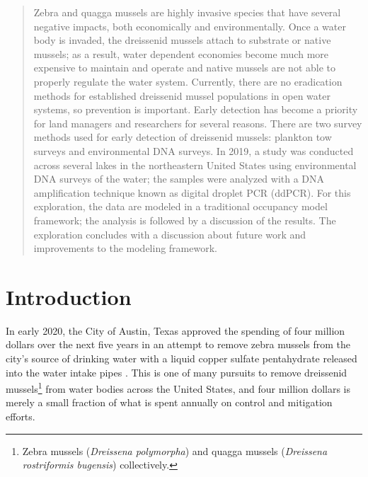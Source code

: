 \documentclass[12pt]{article}\usepackage[]{graphicx}\usepackage[]{color}
\begin{document}
\begin{abstract}
\noindent Zebra and quagga mussels are highly invasive species that have several negative impacts, both economically and environmentally. Once a water body is invaded, the dreissenid mussels attach to substrate or native mussels; as a result, water dependent economies become much more expensive to maintain and operate and native mussels are not able to properly regulate the water system. Currently, there are no eradication methods for established dreissenid mussel populations in open water systems, so prevention is important. Early detection has become a priority for land managers and researchers for several reasons. There are two survey methods used for early detection of dreissenid mussels: plankton tow surveys and environmental DNA surveys. In 2019, a study was conducted across several lakes in the northeastern United States using environmental DNA surveys of the water; the samples were analyzed with a DNA amplification technique known as digital droplet PCR (ddPCR). For this exploration, the data are modeled in a traditional occupancy model framework; the analysis is followed by a discussion of the results. The exploration concludes with a discussion about future work and improvements to the modeling framework. 
\end{abstract}

\newpage

\doublespacing

\section{Introduction}

In early 2020, the City of Austin, Texas approved the spending of four million dollars over the next five years in an attempt to remove zebra mussels from the city's source of drinking water with a liquid copper sulfate pentahydrate released into the water intake pipes \cite{CBS:Austin}. This is one of many pursuits to remove dreissenid mussels\footnote{Zebra mussels (\textit{Dreissena polymorpha}) and quagga mussels (\textit{Dreissena rostriformis bugensis}) collectively.} from water bodies across the United States, and four million dollars is merely a small fraction of what is spent annually on control and mitigation efforts.
\end{document}
